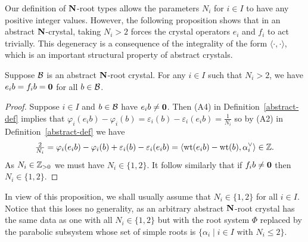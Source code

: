 \documentclass[11pt]{article}
\begin{document}
Our definition of $\mathbf{N}$-root types allows the parameters  $N_i$ for $i \in I$ to have any positive integer values. However, the following proposition shows that in an abstract $\mathbf{N}$-crystal, taking $N_i>2$ forces the crystal operators $e_i$ and $f_i$ to act trivially.
This degeneracy is a consequence of the integrality of the form $\langle\cdot, \cdot\rangle$, which is an important structural property of abstract crystals. 

\begin{proposition}
\label{prop:trivial_large_root}
Suppose $\mathcal{B}$ is an abstract $\mathbf{N}$-root crystal. 
For any $i \in I$ such that $N_i > 2$, we have $e_i b = f_i b = \boldsymbol{0}$ for all $b \in \mathcal{B}$.
\end{proposition}

\begin{proof}
Suppose   $i \in I$  and  $b \in \mathcal{B}$ have $e_i b \neq \boldsymbol{0}$. Then   (A4) in Definition~\ref{abstract-def} implies that
$
 \varphi_i(e_ib)-\varphi_i(b)  = \varepsilon_i(b) - \varepsilon_i(e_ib) = \tfrac{1}{N_i}
$
so by (A2) in  Definition~\ref{abstract-def}  we have 
\[
\tfrac{2}{N_i} =  \varphi_i(e_ib)-\varphi_i(b)  + \varepsilon_i(b) - \varepsilon_i(e_ib) = \langle \operatorname{wt}(e_ib)- \operatorname{wt}(b),\alpha_i^\vee\rangle \in \mathbb{Z}.
\]
As $N_i\in \mathbb{Z}_{>0}$ we must have $N_i \in \{1,2\}$.
It follow similarly that if $f_i b \neq \boldsymbol{0}$ then $N_i \in \{1,2\}$.
\end{proof}

In view of this proposition, we shall usually assume that $N_i \in \{1,2\}$ for all $i \in I$.
Notice that this loses no generality, as an arbitrary abstract $\mathbf{N}$-root crystal has the same data as one with all $N_i \in \{1,2\}$ but with the root system $\Phi$ replaced by the parabolic subsystem whose set of simple roots is $\{\alpha_i \mid i \in I \text{ with }N_i \leq 2\}$.
 
\end{document}

